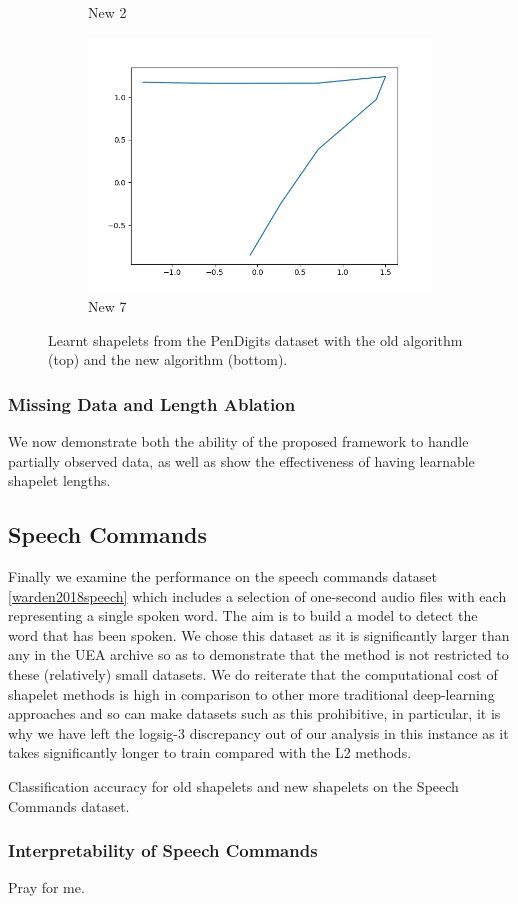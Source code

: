 \begin{figure}[ht]
\begin{subfigure}[b]{0.5\linewidth}
        \caption{New 2}
        \label{fig7:c}
    \end{subfigure}
    \begin{subfigure}[b]{0.5\linewidth}
        \centering
        \includegraphics[width=0.75\linewidth]{images/pendigits/new_7}
        \caption{New 7}
    \end{subfigure}
    \caption{Learnt shapelets from the PenDigits dataset with the old algorithm (top) and the new algorithm (bottom).}
    \label{fig:pendigits}
\end{figure}


\subsubsection{Missing Data and Length Ablation}
We now demonstrate both the ability of the proposed framework to handle partially observed data, as well as show the effectiveness of having learnable shapelet lengths.
\begin{table}[ht]
    \caption{}
    \label{tab:uea_noise}
    \centering
    
\end{table}


\subsection{Speech Commands}
Finally we examine the performance on the speech commands dataset \ref{warden2018speech} which includes a selection of one-second audio files with each representing a single spoken word. The aim is to build a model to detect the word that has been spoken. We chose this dataset as it is significantly larger than any in the UEA archive so as to demonstrate that the method is not restricted to these (relatively) small datasets. We do reiterate that the computational cost of shapelet methods is high in comparison to other more traditional deep-learning approaches and so can make datasets such as this prohibitive, in particular, it is why we have left the logsig-3 discrepancy out of our analysis in this instance as it takes significantly longer to train compared with the L2 methods.
\begin{table}[ht]
    \caption{Classification accuracy for old shapelets and new shapelets on the Speech Commands dataset.}
    \label{tab:speech_commands}
    \centering
    
\end{table}

\subsubsection{Interpretability of Speech Commands}
Pray for me.

